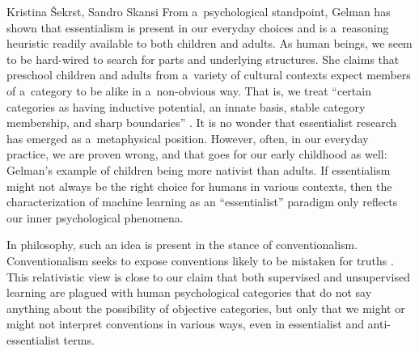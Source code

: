 \begin{artengenv2auth}{Kristina Šekrst, Sandro Skansi}
From a~psychological standpoint, Gelman
\parencite*[][]{gelman_essentialism_2005} %
 has shown that essentialism is present in our everyday choices and is a~reasoning heuristic readily available to both children and adults. As human beings, we seem to be hard-wired to search for parts and underlying structures. She claims that preschool children and adults from a~variety of cultural contexts expect members of a~category to be alike in a~non-obvious way. That is, we treat ``certain categories as having inductive potential, an innate basis, stable category membership, and sharp boundaries'' 
\parencite[][]{gelman_essentialism_2005}. %
 It is no wonder that essentialist research has emerged as a~metaphysical position. However, often, in our everyday practice, we are proven wrong, and that goes for our early childhood as well: Gelman's 
\parencite*[][]{gelman_psychological_2004} %
 example of children being more nativist than adults. If essentialism might not always be the right choice for humans in various contexts, then the characterization of machine learning as an ``essentialist'' paradigm only reflects our inner psychological phenomena.

In philosophy, such an idea is present in the stance of conventionalism. Conventionalism seeks to expose conventions likely to be mistaken for truths
\parencite[][p.2]{ben-menahem_conventionalism_2006}. %
 This relativistic view is close to our claim that both supervised and unsupervised learning are plagued with human psychological categories that do not say anything about the possibility of objective categories, but only that we might or might not interpret conventions in various ways, even in essentialist and anti-essentialist terms.


\end{artengenv2auth}

